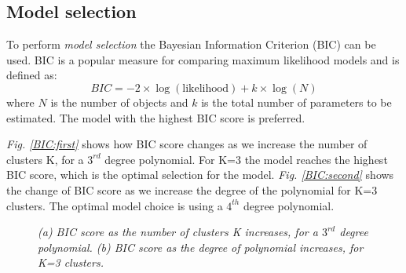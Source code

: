 \subsection{Model selection} \label{meth-synth-model-subsect}
To perform \emph{model selection} the Bayesian Information Criterion (BIC) \citep{Schwarz1978} can be used. BIC is a popular measure for comparing maximum likelihood models and is defined as:
\begin{equation}
	BIC = -2 \times \log (\text{likelihood}) + k \times \log (N)
\end{equation}
where $N$ is the number of objects and $k$ is the total number of parameters to be estimated. The model with the highest BIC score is preferred.

\emph{Fig. \ref{BIC:first}} shows how BIC score changes as we increase the number of clusters K, for a $3^{rd}$ degree polynomial. For K=3 the model reaches the highest BIC score, which is the optimal selection for the model. \emph{Fig. \ref{BIC:second}} shows the change of BIC score as we increase the degree of the polynomial for K=3 clusters. The optimal model choice is using a $4^{th}$ degree polynomial.
\begin{figure}[ht!]
     \begin{center}
    \end{center}
    \caption{\emph{(a) BIC score as the number of clusters K increases, for a $3^{rd}$ degree polynomial. (b) BIC score as the degree of polynomial increases, for K=3 clusters.}}
   \label{BIC-pic}
\end{figure}